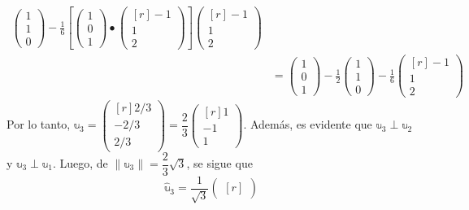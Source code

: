 \begin{example}
\begin{align*}
\begin{pmatrix}
            1 \\
            1 \\
            0
        \end{pmatrix} - \frac{1}{6} \left[ \begin{pmatrix}
            1 \\
            0 \\
            1
        \end{pmatrix} \bullet \begin{pmatrix*}[r]
            -1 \\
            1 \\
            2
        \end{pmatrix*} \right] \begin{pmatrix*}[r]
            -1 \\
            1 \\
            2
        \end{pmatrix*} \\
        & = \begin{pmatrix}
            1 \\
            0 \\
            1
        \end{pmatrix} - \frac{1}{2} \begin{pmatrix}
            1 \\
            1 \\
            0
        \end{pmatrix} - \frac{1}{6} \begin{pmatrix*}[r]
            -1 \\
            1 \\
            2
        \end{pmatrix*}
    \end{align*}
    Por lo tanto, $\mathbb{u}_3 = \begin{pmatrix*}[r]
        2/3 \\
        -2/3 \\
        2/3
    \end{pmatrix*} = \dfrac{2}{3} \begin{pmatrix*}[r]
        1 \\
        -1 \\
        1
    \end{pmatrix*}$. Además, es evidente que $\mathbb{u}_3 \perp \mathbb{u}_2$ y $\mathbb{u}_3 \perp \mathbb{u}_1$. Luego, de $\| \mathbb{u}_3 \| = \dfrac{2}{3} \sqrt{3}$, se sigue que
    $$\hat{\mathbb{u}}_3 = \frac{1}{\sqrt{3}} \begin{pmatrix*}[r]

\end{pmatrix*}$$
\end{example}
